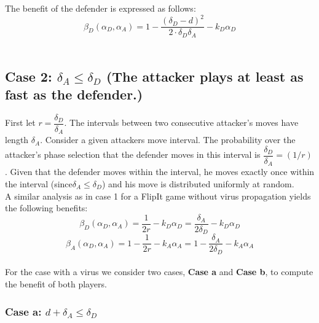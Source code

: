  The benefit of the defender is expressed as follows:
 \begin{equation}\label{first}
\beta_{D}(\alpha_{D},\alpha_{A}) = 1 - \dfrac { (\delta_{D}-d) ^{2}} {2 \cdot \delta_{D}  \delta_{A}} - k_{D} \alpha_{D}
\end{equation}
~~\\





\subsection*{\textbf{Case 2:} $\delta_{A} \leq \delta_{D} $ (The attacker plays at least as fast as the defender.) }

First let $r = \dfrac{\delta_{D}}{ \delta_{A} }$. The intervals between two consecutive attacker's moves have length $\delta_{A}$. Consider a given attackers move interval. The probability over the attacker's phase selection that the defender moves in this interval is $\dfrac{\delta_{D}}{ \delta_{A} } = (1/r)$. Given that the defender moves within the interval, he moves exactly once within the interval (since$\delta_{A} \leq \delta_{D} $) and his move is distributed uniformly at random. \\

A similar analysis as in case 1 for a FlipIt game without virus propagation yields the following benefits:
\begin{equation}\label{first}
\beta_{D}(\alpha_{D},\alpha_{A}) = \dfrac {1} {2r} - k_{D} \alpha_{D} = \dfrac {\delta_{A}} {2\delta_{D}} - k_{D} \alpha_{D} 
\end{equation}
\begin{equation}\label{first}
\beta_{A}(\alpha_{D},\alpha_{A}) =1 - \dfrac {1} {2r} - k_{A} \alpha_{A} = 1- \dfrac {\delta_{A}} {2\delta_{D}} - k_{A} \alpha_{A}  
\end{equation}\\


For the case with a virus we consider two cases, \textbf{Case a} and \textbf{Case b}, to compute the benefit of both players.  \\


\subsubsection*{\textbf{Case a:} $d + \delta_{A} \leq \delta_{D}$}

